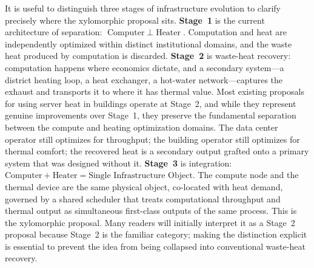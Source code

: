 \documentclass[12pt, oneside]{article}
\begin{document}
It is useful to distinguish three stages of infrastructure evolution to clarify precisely where the xylomorphic proposal sits. \textbf{Stage~1} is the current architecture of separation: $\text{Computer} \;\perp\; \text{Heater}$. Computation and heat are independently optimized within distinct institutional domains, and the waste heat produced by computation is discarded. \textbf{Stage~2} is waste-heat recovery: computation happens where economics dictate, and a secondary system---a district heating loop, a heat exchanger, a hot-water network---captures the exhaust and transports it to where it has thermal value. Most existing proposals for using server heat in buildings operate at Stage~2, and while they represent genuine improvements over Stage~1, they preserve the fundamental separation between the compute and heating optimization domains. The data center operator still optimizes for throughput; the building operator still optimizes for thermal comfort; the recovered heat is a secondary output grafted onto a primary system that was designed without it. \textbf{Stage~3} is integration: $\text{Computer} + \text{Heater} = \text{Single Infrastructure Object}$. The compute node and the thermal device are the same physical object, co-located with heat demand, governed by a shared scheduler that treats computational throughput and thermal output as simultaneous first-class outputs of the same process. This is the xylomorphic proposal. Many readers will initially interpret it as a Stage~2 proposal because Stage~2 is the familiar category; making the distinction explicit is essential to prevent the idea from being collapsed into conventional waste-heat recovery.
\end{document}
